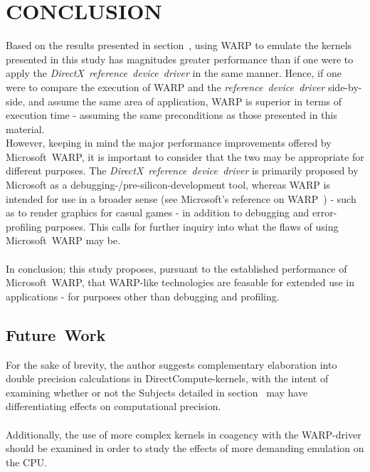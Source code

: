 
\section{CONCLUSION}
\label{sec:conclusion}
Based on the results presented in section~, using WARP to emulate the kernels presented in this study has magnitudes greater performance than if one were to apply the \textit{DirectX}~\textit{reference~device~driver} in the same manner.
Hence, if one were to compare the execution of WARP and the \textit{reference~device~driver} side-by-side, and assume the same area of application, WARP is superior in terms of execution time - assuming the same preconditions as those presented in this material.\\
However, keeping in mind the major performance improvements offered by Microsoft~WARP, it is important to consider that the two may be appropriate for different purposes.
The \textit{DirectX}~\textit{reference~device~driver} is primarily proposed by Microsoft as a debugging-/pre-silicon-development tool, whereas WARP is intended for use in a broader sense (see Microsoft's reference on WARP~) - such as to render graphics for casual games - in addition to debugging and error-profiling purposes.
This calls for further inquiry into what the flaws of using Microsoft~WARP may be.\\
\\
In conclusion; this study proposes, pursuant to the established performance of Microsoft~WARP, that WARP-like technologies are feasable for extended use in applications - for purposes other than debugging and profiling.

\subsection{Future~Work}
\label{sec:conclusion:futurework}
For the sake of brevity, the author suggests complementary elaboration into double precision calculations in DirectCompute-kernels, with the intent of examining whether or not the Subjects detailed in section~ may have differentiating effects on computational precision.\\
\\
Additionally, the use of more complex kernels in coagency with the WARP-driver should be examined in order to study the effects of more demanding emulation on the CPU.

